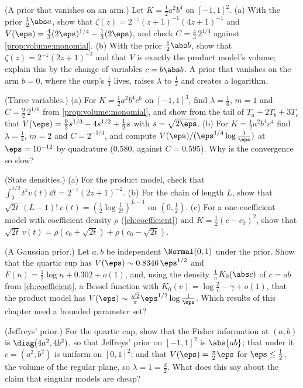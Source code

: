 \begin{refsection}
\begin{exercises}
\item \byhand (A prior that vanishes on an arm.) Let $K=\frac12a^2b^4$ on $[-1,1]^2$. (a) With the prior $\frac12\abs a$, show that $\zeta(z)=2^{-z}(z+1)^{-1}(4z+1)^{-1}$ and $V(\eps)=\frac43(2\eps)^{1/4}-\frac13(2\eps)$, and check $C=\frac43\,2^{1/4}$ against \cref{prop:volume:monomial}. (b) With the prior $\frac12\abs b$, show that $\zeta(z)=2^{-z}(2z+1)^{-2}$ and that $V$ is exactly the product model's volume; explain this by the change of variables $c=b\abs b$. A prior that vanishes on the arm $b=0$, where the cusp's $\frac14$ lives, raises $\lambda$ to $\frac12$ and creates a logarithm.\label{ex:volume:arm}

\item \byhand (Three variables.) (a) For $K=\frac12a^2b^4c^6$ on $[-1,1]^3$, find $\lambda=\frac16$, $m=1$ and $C=\frac92\,2^{1/6}$ from \cref{prop:volume:monomial}, and show from the tail of $T_a+2T_b+3T_c$ that $V(\eps)=\frac92s^{1/3}-4s^{1/2}+\frac12s$ with $s=\sqrt{2\eps}$. (b) For $K=\frac12a^2b^4c^4$ find $\lambda=\frac14$, $m=2$ and $C=2^{-3/4}$, and compute $V(\eps)/(\eps^{1/4}\log\frac1\eps)$ at $\eps=10^{-12}$ by quadrature ($0.580$, against $C=0.595$). Why is the convergence so slow?\label{ex:volume:three}

\item \byhand (State densities.) (a) For the product model, check that $\int_0^{1/2}t^zv(t)\dd t=2^{-z}(2z+1)^{-2}$. (b) For the chain of length $L$, show that $\sqrt{2t}\,(L-1)!\,v(t)=(\frac12\log\frac1{2t})^{L-1}$ on $(0,\frac12)$. (c) For a one-coefficient model with coefficient density $\rho$ (\cref{ch:coefficient}) and $K=\frac12(c-c_0)^2$, show that $\sqrt{2t}\,v(t)=\rho(c_0+\sqrt{2t})+\rho(c_0-\sqrt{2t})$.\label{ex:volume:density}

\item \variation (A Gaussian prior.) Let $a,b$ be independent $\Normal(0,1)$ under the prior. Show that the quartic cup has $V(\eps)\sim0.8346\,\eps^{1/2}$ and $\bar F(n)=\frac12\log n+0.302+o(1)$, and, using the density $\frac1\pi K_0(\abs c)$ of $c=ab$ from \cref{ch:coefficient}, a Bessel function with $K_0(v)=\log\frac2v-\gamma+o(1)$, that the product model has $V(\eps)\sim\frac{\sqrt2}\pi\eps^{1/2}\log\frac1\eps$. Which results of this chapter need a bounded parameter set?\label{ex:volume:gaussian}

\item \variation (Jeffreys' prior.) For the quartic cup, show that the Fisher information at $(a,b)$ is $\diag(4a^2,4b^2)$, so that Jeffreys' prior on $[-1,1]^2$ is $\abs{ab}$; that under it $c=(a^2,b^2)$ is uniform on $[0,1]^2$; and that $V(\eps)=\frac\pi2\eps$ for $\eps\le\frac12$, the volume of the regular plane, so $\lambda=1=\frac d2$. What does this say about the claim that singular models are cheap?\label{ex:volume:jeffreys}


\end{exercises}
\end{refsection}
